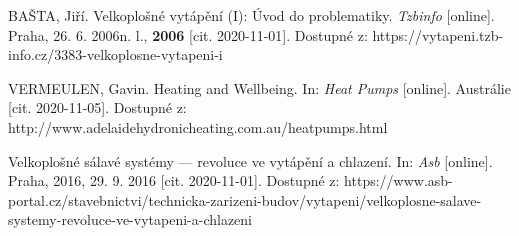 \begin{thebibliography}{3}

BAŠTA, Jiří. Velkoplošné vytápění (I): Úvod do problematiky. \textit{Tzbinfo} [online]. Praha, 26. 6. 2006n. l., \textbf{2006} [cit. 2020-11-01]. Dostupné z: https://vytapeni.tzb-info.cz/3383-velkoplosne-vytapeni-i

VERMEULEN, Gavin. Heating and Wellbeing. In: \textit{Heat Pumps} [online]. Austrálie [cit. 2020-11-05]. Dostupné z: http://www.adelaidehydronicheating.com.au/heatpumps.html

Velkoplošné sálavé systémy --- revoluce ve vytápění a chlazení. In: \textit{Asb} [online]. Praha, 2016, 29. 9. 2016 [cit. 2020-11-01]. Dostupné z: https://www.asb-portal.cz/stavebnictvi/technicka-zarizeni-budov/vytapeni/velkoplosne-salave-systemy-revoluce-ve-vytapeni-a-chlazeni

\end{thebibliography}